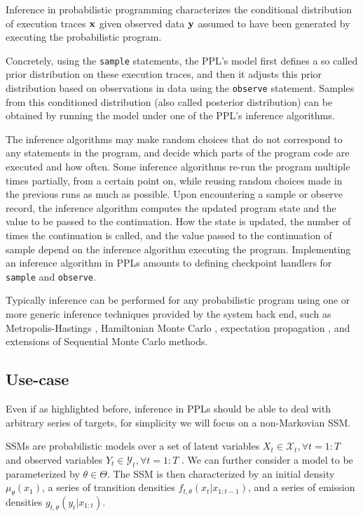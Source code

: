 Inference in probabilistic programming characterizes the conditional distribution of execution traces $\boldsymbol{\mathbf{x}}$ given observed data $\boldsymbol{\mathbf{y}}$ assumed to have been generated by executing the probabilistic program.

Concretely, using the \texttt{sample} statements, the \gls{PPL}'s model first defines a so called prior distribution on these execution traces, and then it adjusts this prior distribution based on observations in data using the \texttt{observe} statement. Samples from this conditioned distribution (also called posterior distribution) can be obtained by running the model under one of the \gls{PPL}’s inference algorithms.


The inference algorithms may make random choices that do not correspond to any statements in the program, and decide which parts of the program code are executed and how often. Some inference algorithms re-run the program multiple times partially, from a certain point on, while reusing random choices made in the previous runs as much as possible.
Upon encountering a sample or observe record, the inference algorithm computes the updated program state and the value to be passed to the continuation. How the state is updated, the number of times the continuation is called, and the value passed to the continuation of sample depend on the inference algorithm executing the program.
Implementing an inference algorithm in \glspl{PPL} amounts to defining 
checkpoint handlers for \texttt{sample} and \texttt{observe}.

Typically inference can be performed for any probabilistic program using one or more generic inference techniques provided by the system back end, such as Metropolis-Hastings \cite{Wingate:2011ul, Mansinghka:2014ty}, Hamiltonian Monte Carlo \cite{Stan}, expectation propagation \cite{InferNET}, and extensions of Sequential Monte Carlo \cite{vandeMeent:2015uk, Paige:2014tc, Wood:2015tr} methods.

\subsection{Use-case}
Even if as highlighted before, inference in \glspl{PPL} should be able to deal with arbitrary series of targets, for simplicity we will focus on a non-Markovian \gls{SSM}.

\Gls{SSM}s are probabilistic models over a set of latent variables $X_t \in \mathcal{X}_t, \forall t = 1 : T$ and observed variables $Y_t \in \mathcal{Y}_t , \forall t = 1 : T$ . We can further consider a model to be parameterized by $\theta \in \Theta$. The \gls{SSM} is then characterized by an initial density $\mu_\theta(x_1)$, a series of transition densities $f_{t,\theta}(x_t|x_{1:t-1})$, and a series of emission densities $g_{t,\theta}(y_t|x_{1:t})$.

